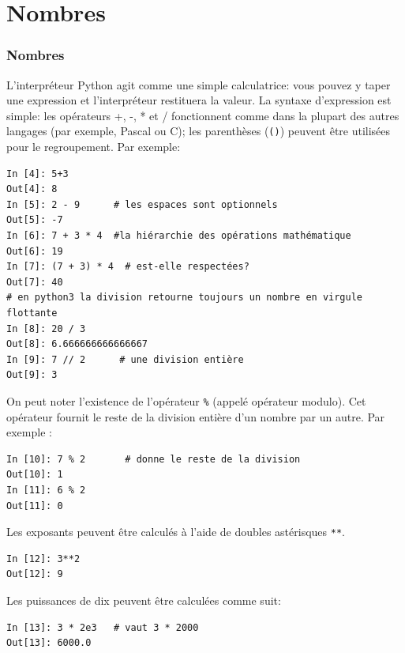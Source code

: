\documentclass{beamer}
\begin{document}
\section{Nombres}

\begin{frame}
\frametitle{Nombres}


L'interpréteur Python agit comme une simple calculatrice: vous pouvez y taper une expression et l'interpréteur restituera la valeur. La syntaxe d'expression est simple: les opérateurs +, -, * et / fonctionnent comme dans la plupart des autres langages (par exemple, Pascal ou C); les parenthèses (\texttt{()}) peuvent être utilisées pour le regroupement. Par exemple:

\begin{verbatim}
In [4]: 5+3
Out[4]: 8
In [5]: 2 - 9      # les espaces sont optionnels
Out[5]: -7
In [6]: 7 + 3 * 4  #la hiérarchie des opérations mathématique
Out[6]: 19
In [7]: (7 + 3) * 4  # est-elle respectées?
Out[7]: 40
# en python3 la division retourne toujours un nombre en virgule flottante
In [8]: 20 / 3
Out[8]: 6.666666666666667
In [9]: 7 // 2      # une division entière
Out[9]: 3
\end{verbatim}


\end{frame}

\begin{frame}

On peut noter l’existence de l’opérateur \Verb!%! (appelé opérateur modulo). Cet opérateur fournit le reste de la division entière d’un nombre par un autre. Par exemple :

\begin{verbatim}
In [10]: 7 % 2       # donne le reste de la division
Out[10]: 1
In [11]: 6 % 2
Out[11]: 0
\end{verbatim}

Les exposants peuvent être calculés à l'aide de doubles astérisques \texttt{**}.

\begin{verbatim}
In [12]: 3**2
Out[12]: 9
\end{verbatim}

Les puissances de dix peuvent être calculées comme suit:

\begin{verbatim}
In [13]: 3 * 2e3   # vaut 3 * 2000
Out[13]: 6000.0
\end{verbatim}
\end{frame}
\end{document}
